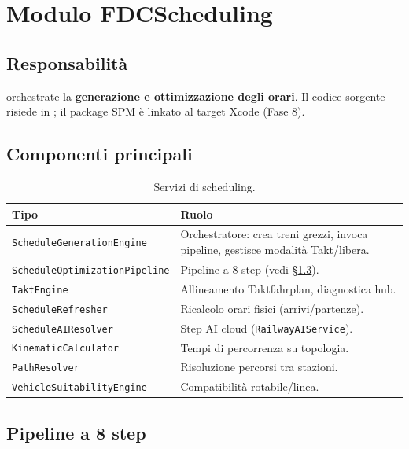 \chapter{Modulo FDCScheduling}
\label{ch:fdcscheduling}

\section{Responsabilità}

 orchestrate la \textbf{generazione e ottimizzazione
degli orari}. Il codice sorgente risiede in
; il package SPM
 è linkato al target Xcode (Fase 8).

\section{Componenti principali}

\begin{table}[htbp]
\centering
\caption{Servizi di scheduling.}
\begin{tabularx}{\textwidth}{lX}
  \toprule
  \textbf{Tipo} & \textbf{Ruolo} \\
  \midrule
  \texttt{ScheduleGenerationEngine} & Orchestratore: crea treni grezzi,
    invoca pipeline, gestisce modalità Takt/libera. \\
  \texttt{ScheduleOptimizationPipeline} & Pipeline a 8 step (vedi \S\ref{sec:pipeline}). \\
  \texttt{TaktEngine} & Allineamento Taktfahrplan, diagnostica hub. \\
  \texttt{ScheduleRefresher} & Ricalcolo orari fisici (arrivi/partenze). \\
  \texttt{ScheduleAIResolver} & Step AI cloud (\texttt{RailwayAIService}). \\
  \texttt{KinematicCalculator} & Tempi di percorrenza su topologia. \\
  \texttt{PathResolver} & Risoluzione percorsi tra stazioni. \\
  \texttt{VehicleSuitabilityEngine} & Compatibilità rotabile/linea. \\
  \bottomrule
\end{tabularx}
\end{table}

\section{Pipeline a 8 step}
\label{sec:pipeline}

